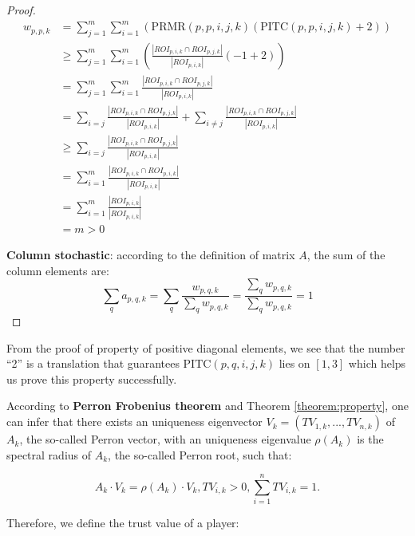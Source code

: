 \begin{proof}
\begin{equation}
\begin{aligned}
w_{p,p,k} &= 
\sum_{j=1}^{m}{
\sum_{i=1}^{m}{ 
  \left(
    \text{PRMR}(p, p, i, j, k)
    \left(
      \text{PITC}(p, p, i, j, k) + 2
    \right)
  \right)
}} \\
&\geq \sum_{j=1}^{m}{
\sum_{i=1}^{m}{ \left(
  \frac{| ROI_{p,i,k} \cap ROI_{p,j,k} | }{|ROI_{p,i,k}|}
  \left(
    -1 + 2
  \right)
\right)}} \\
&= \sum_{j=1}^{m}{
\sum_{i=1}^{m}{
  \frac{| ROI_{p,i,k} \cap ROI_{p,j,k} | }{|ROI_{p,i,k}|}
}}\\
&= \sum_{i=j}{\frac{| ROI_{p,i,k} \cap ROI_{p,j,k} | }{|ROI_{p,i,k}|}} 
 + \sum_{i\neq j}{\frac{| ROI_{p,i,k} \cap ROI_{p,j,k} | }{|ROI_{p,i,k}|}}\\
&\geq \sum_{i=j}{\frac{| ROI_{p,i,k} \cap ROI_{p,j,k} | }{|ROI_{p,i,k}|}}\\
&= \sum_{i=1}^{m}{\frac{| ROI_{p,i,k} \cap ROI_{p,i,k} | }{|ROI_{p,i,k}|}}\\
&= \sum_{i=1}^{m}{\frac{| ROI_{p,i,k}|}{|ROI_{p,i,k}|}}\\
&= m > 0
\end{aligned}
\end{equation}

\textbf{Column stochastic}: according to the definition of matrix $A$, the sum of the column
elements are:
\begin{equation}
  \sum_{q}{a_{p,q,k}} 
  = \sum_{q}{ \frac{w_{p,q,k}}{ \sum_{q}{w_{p,q,k}} }}
  = \frac{\sum_{q}{w_{p,q,k}}}{\sum_{q}{w_{p,q,k}}} = 1
\end{equation}
\end{proof}

From the proof of property of positive diagonal elements, we see that the number ``2'' is 
a translation that guarantees $\text{PITC}(p, q, i, j, k)$ lies on $[1, 3]$ which helps us
prove this property successfully.

According to \textbf{Perron Frobenius theorem} \cite{perron1907theorie, frobenius1912matrizen} and 
Theorem \ref{theorem:property},
one can infer that there exists an uniqueness eigenvector $V_k = (TV_{1,k}, ..., TV_{n,k})$ of $A_k$,
the so-called Perron vector, with an uniqueness eigenvalue $\rho(A_k)$ is the spectral	radius
of $A_k$, the so-called Perron root, such that:

\[
A_k \cdot V_k = \rho(A_k) \cdot V_k, TV_{i,k} > 0, \sum_{i=1}^{n}{TV_{i,k}} = 1.
\]

Therefore, we define the trust value of a player:

